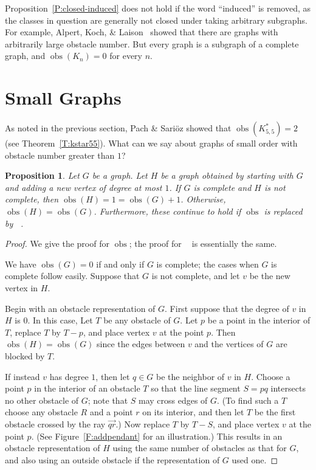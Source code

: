 \documentclass[12pt]{amsart}
\newtheorem{proposition}[theorem]{Proposition}
\theoremstyle{remark}
\DeclareMathOperator{\obs}{\ensuremath{\mathrm{obs}}}
\DeclareMathOperator{\obsout}{\ensuremath{\obs_\mathrm{out}}}
\begin{document}
Proposition~\ref{P:closed-induced}
does not hold if the word ``induced'' is removed,
as the classes in question are generally not closed under
taking arbitrary subgraphs.
For example, Alpert, Koch, \& Laison~\cite[Thm.~2]{AlpKocLai10}
showed that there are graphs with arbitrarily large obstacle number.
But every graph is a subgraph of a complete graph,
and $\obs(K_n) = 0$ for every $n$.


\section{Small Graphs} \label{S:small}

As noted in the previous section,
Pach \& Sari\"{o}z showed that
$\obs(K^{*}_{5,5}) = 2$
(see Theorem~\ref{T:kstar55}).
What can we say about graphs of small order
with obstacle number greater than $1$?

\begin{proposition} \label{P:pendant}
Let $G$ be a graph.
Let $H$ be a graph obtained by starting with
$G$ and adding a new vertex of degree at most $1$.
If $G$ is complete and $H$ is not complete,
then
$\obs(H) = 1 = \obs(G)+1$.
Otherwise,
$\obs(H) = \obs(G)$.
Furthermore,
these continue to hold if
$\obs$
is replaced by
$\obsout$.\end{proposition}

\begin{proof}
We give the proof for $\obs$;
the proof for $\obsout$ is essentially the same.

We have $\obs(G) = 0$ if and only if $G$ is complete;
the cases when $G$ is complete follow easily.
Suppose that $G$ is not complete,
and let $v$ be the new vertex in $H$.

Begin with an obstacle representation of $G$.
First suppose that the degree of $v$ in $H$ is $0$.
In this case, Let $T$ be any obstacle of $G$.
Let $p$ be a point in the interior of $T$, replace $T$ by $T-p$,
and place vertex $v$ at the point $p$.
Then $\obs(H) = \obs(G)$
since the edges between $v$ and the vertices of
$G$ are blocked by $T$.

If instead $v$ has degree $1$,
then let $q\in G$ be the neighbor of $v$ in $H$.
Choose a point $p$ in the interior of an obstacle $T$
so that the line segment $S=pq$ intersects no other obstacle of $G$;
note that $S$ may cross edges of $G$.
(To find such a $T$ choose any obstacle $R$ and a point $r$ on its interior,
and then let $T$ be the first obstacle
crossed by the ray $\overrightarrow{qr}$.)
Now replace $T$ by $T-S$,
and place vertex $v$ at the point $p$.
(See Figure~\ref{F:addpendant} for an illustration.)
This results in an obstacle representation of $H$
using the same number of obstacles as that for $G$,
and also using an outside obstacle
if the representation of $G$ used one.\end{proof}
\end{document}
